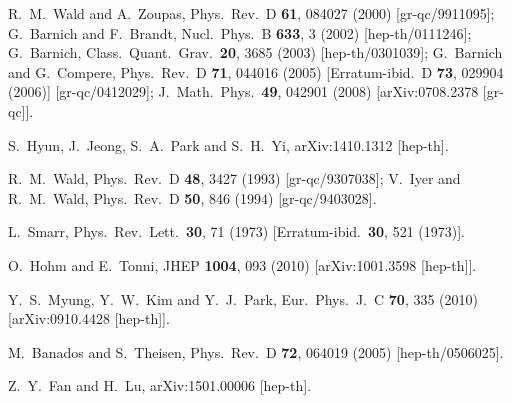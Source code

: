 \documentclass[prd,twocolumn,superscriptaddress,amsmath,amssymb,nofootinbib]{revtex4-1}
\begin{document}
\begin{thebibliography}{99}
  R.~M.~Wald and A.~Zoupas,
  Phys.\ Rev.\ D {\bf 61}, 084027 (2000)
  [gr-qc/9911095];
  G.~Barnich and F.~Brandt,
  Nucl.\ Phys.\ B {\bf 633}, 3 (2002)
  [hep-th/0111246];
  G.~Barnich,
  Class.\ Quant.\ Grav.\  {\bf 20}, 3685 (2003)
  [hep-th/0301039];
  G.~Barnich and G.~Compere,
  Phys.\ Rev.\ D {\bf 71}, 044016 (2005)
  [Erratum-ibid.\ D {\bf 73}, 029904 (2006)]
  [gr-qc/0412029];
  J.\ Math.\ Phys.\  {\bf 49}, 042901 (2008)
  [arXiv:0708.2378 [gr-qc]].

  S.~Hyun, J.~Jeong, S.~A.~Park and S.~H.~Yi,
  arXiv:1410.1312 [hep-th].

  R.~M.~Wald,
  Phys.\ Rev.\ D {\bf 48}, 3427 (1993)
  [gr-qc/9307038];
  V.~Iyer and R.~M.~Wald,
  Phys.\ Rev.\ D {\bf 50}, 846 (1994)
  [gr-qc/9403028].

  L.~Smarr,
  Phys.\ Rev.\ Lett.\  {\bf 30}, 71 (1973)
  [Erratum-ibid.\  {\bf 30}, 521 (1973)].

  O.~Hohm and E.~Tonni,
  JHEP {\bf 1004}, 093 (2010)
  [arXiv:1001.3598 [hep-th]].

  Y.~S.~Myung, Y.~W.~Kim and Y.~J.~Park,
  Eur.\ Phys.\ J.\ C {\bf 70}, 335 (2010)
  [arXiv:0910.4428 [hep-th]].

  M.~Banados and S.~Theisen,
  Phys.\ Rev.\ D {\bf 72}, 064019 (2005)
  [hep-th/0506025].

  Z.~Y.~Fan and H.~Lu,
  arXiv:1501.00006 [hep-th].


\end{thebibliography}
\end{document}
